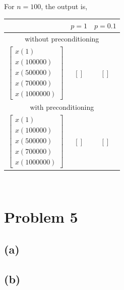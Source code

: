 \documentclass[11pt]{article}
\theoremstyle{definition}
\theoremstyle{remark}
\newcommand{\newquestion}{\hrulefill\vspace{-0.8\baselineskip}\\\null\hrulefill\vspace{-1.0\baselineskip}}
\newcommand{\newpart}{\vspace{-0.5\baselineskip}\hrulefill\vspace{-1.3\baselineskip}}
\theoremstyle{plain}
\begin{document}
For $n=100$, the output is,

\begin{tabular}{c|c|c}
  &$p=1$&$p=0.1$\\\hline
  \multicolumn{3}{c}{without preconditioning}\\\hline
  $\left[
  \begin{array}{c}
    x(1)\\
    x(100000)\\
    x(500000)\\
    x(700000)\\
    x(1000000)
  \end{array}
  \right]$&$\left[\right]$&$\left[\right]$\\\hline
  \multicolumn{3}{c}{with preconditioning}\\\hline
  $\left[\begin{array}{c}
           x(1)\\
           x(100000)\\
           x(500000)\\
           x(700000)\\
           x(1000000)
         \end{array}
  \right]$&$\left[\right]$&$\left[\right]$\\
\end{tabular}

\newpage
\newquestion
%
%
\section*{Problem 5}

\newpart
\subsection*{(a)}


\newpart
\subsection*{(b)}

\end{document}
